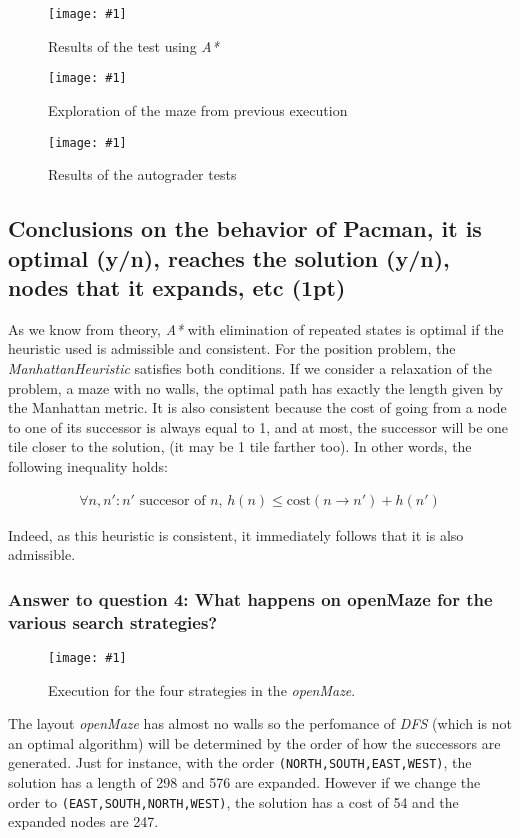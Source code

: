 \documentclass{article}
\newcommand{\myFigure}[4]{%
    \begin{figure}[H]
        \texttt{[image: \#1]}
        \centering
        \caption{#2}
        \label{#3}
    \end{figure}
}
\begin{document}
\myFigure{./img/ex4/victoryAS}{Results of the test using \emph{A*}}{victoryAS}{1}

\myFigure{./img/ex4/ASbig}{Exploration of the maze from previous execution}{victoryAS}{.4}

\myFigure{./img/ex4/test4}{Results of the autograder tests}{test4}{.7}

\subsection{Conclusions on the behavior of Pacman, it is optimal (y/n), reaches the solution (y/n), nodes that it expands, etc (1pt)}

As we know from theory, \textit{A*} with elimination of repeated states is optimal if the heuristic used is admissible and consistent. For the position problem, the \emph{ManhattanHeuristic} satisfies both conditions. If we consider a relaxation of the problem, a maze with no walls, the optimal path has exactly the length given by the Manhattan metric. It is also consistent because the cost of going from a node to one of its successor is always equal to 1, and at most, the successor will be one tile closer to the solution, (it may be 1 tile farther too). In other words, the following inequality holds:

\begin{equation}
    \begin{split}
    \forall n,n':n' \text{ succesor of }n \text{, }
    h(n) \leq \text{cost}(n \rightarrow n')+h(n') 
    \label{consistent}
    \end{split}
\end{equation}

Indeed, as this heuristic is consistent, it immediately follows that it is also admissible.


\subsubsection{Answer to question 4: What happens on openMaze for the various search strategies?}

\myFigure{./img/ex4/openMaze}{Execution for the four strategies in the \emph{openMaze}.}{openMaze}{.9}

The layout \emph{openMaze} has almost no walls so the perfomance of \textit{DFS} (which is not an optimal algorithm) will be determined by the order of how the successors are generated. Just for instance, with the order \texttt{(NORTH,SOUTH,EAST,WEST)}, the solution has a length of 298 and 576 are expanded. However if we change the order to \texttt{(EAST,SOUTH,NORTH,WEST)}, the solution has a cost of 54 and the expanded nodes are 247. 
\end{document}
